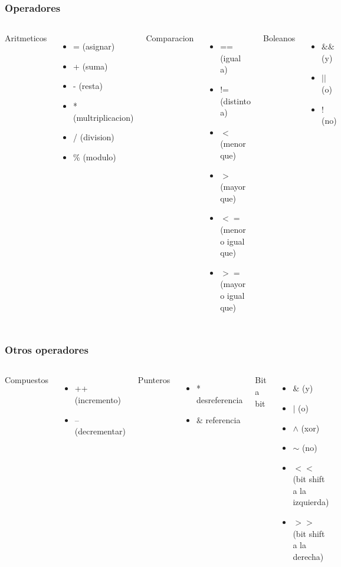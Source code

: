\documentclass{beamer}
\begin{document}
\begin{frame}
\frametitle{Operadores}
\begin{columns}[c]
Aritmeticos
\begin{itemize}
\item = (asignar)
\item + (suma)
\item - (resta)
\item * (multriplicacion)
\item / (division)
\item \% (modulo)
\end{itemize}
Comparacion
\begin{itemize}
\item == (igual a)
\item != (distinto a)
\item $<$ (menor que)
\item $>$ (mayor que)
\item $<=$ (menor o igual que)
\item $>=$ (mayor o igual que)
\end{itemize}
Boleanos
\begin{itemize}
\item $\&\&$ (y)
\item $||$ (o)
\item ! (no)
\end{itemize}
\end{columns}
\end{frame}

\begin{frame}
\frametitle{Otros operadores}
\begin{columns}[c]
Compuestos
\begin{itemize}
\item ++ (incremento)
\item -- (decrementar)
\end{itemize}
Punteros
\begin{itemize}
\item * desreferencia
\item $\&$ referencia
\end{itemize}
Bit a bit
\begin{itemize}
\item $\&$ (y)
\item $|$ (o)
\item $\wedge$ (xor)
\item $\sim$ (no)
\item $<<$ (bit shift a la izquierda)
\item $>>$ (bit shift a la derecha)
\end{itemize}
\end{columns}
\end{frame}
\end{document}

